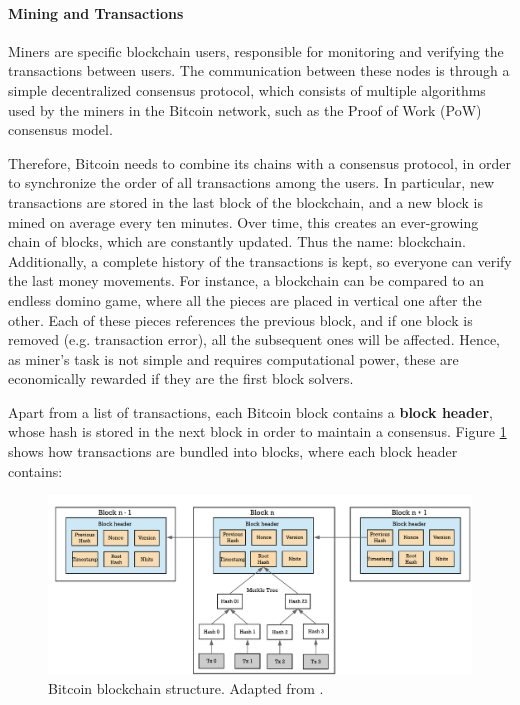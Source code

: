 \paragraph{Mining and Transactions} \label{mining_Transactions}

Miners are specific blockchain users, responsible for monitoring and verifying the transactions between users. The communication between these nodes is through a simple decentralized consensus protocol, which consists of multiple algorithms used by the miners in the Bitcoin network, such as the Proof of Work (PoW) consensus model.

Therefore, Bitcoin needs to combine its chains with a consensus protocol, in order to synchronize the order of all transactions among the users. In particular, new transactions are stored in the last block of the blockchain, and a new block is mined on average every ten minutes. Over time, this creates an ever-growing chain of blocks, which are constantly updated. Thus the name: blockchain. Additionally, a complete history of the transactions is kept, so everyone can verify the last money movements. For instance, a blockchain can be compared to an endless domino game, where all the pieces are placed in vertical one after the other. Each of these pieces references the previous block, and if one block is removed (e.g. transaction error), all the subsequent ones will be affected. Hence, as miner's task is not simple and requires computational power, these are economically rewarded if they are the first block solvers.

Apart from a list of transactions, each Bitcoin block contains a \textbf{block header}, whose hash is stored in the next block in order to maintain a consensus. Figure \ref{fig:Bitcoin Blockchain mining} shows how transactions are bundled into blocks, where each block header contains:

\begin{figure}[t]
  	\includegraphics[width=1\linewidth]{gfx/mining}    
  	\caption{Bitcoin blockchain structure. Adapted from \citep{hans2017blockchain}.}
  	\label{fig:Bitcoin Blockchain mining}
\end{figure}

